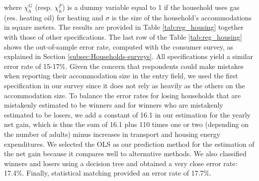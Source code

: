 \documentclass[12pt]{article} %
\begin{document}
\begin{appendices}
\noindent
where $\chi^G_h$ (resp. $\chi^F_h$) is a dummy variable equal to 1 if the household uses gas (res. heating oil) for heating and $\sigma$ is the size of the household's accommodations in square meters. The results are provided in Table \ref{tab:reg_housing} together with those of other specifications. The last row of the Table \ref{tab:reg_housing} shows the out-of-sample error rate, computed with the consumer survey, as explained in Section \ref{subsec:Households-surveys}. All specifications yield a similar error rate of 15-17\%. Given the concern that respondents could make mistakes when reporting their accommodation size in the entry field, we used the first specification in our survey since it does not rely as heavily as the others on the accommodation size. To balance the error rates for losing households that are mistakenly estimated to be winners and for winners who are mistakenly estimated to be losers, we add a constant of 16.1 in our estimation for the yearly net gain, which is thus the sum of 16.1 plus 110 times one or two (depending on the number of adults) minus increases in transport and housing energy expenditures. We selected the OLS as our prediction method for the estimation of the net gain because it compares well to alternative methods. We also classified winners and losers using a decision tree and obtained a very close error rate: 17.4\%. Finally, statistical matching provided an error rate of 17.7\%.




\end{appendices}
\end{document}

